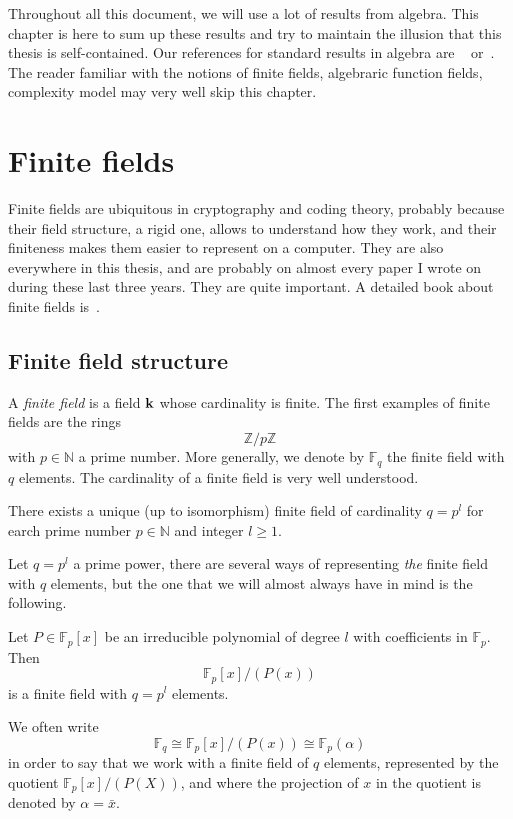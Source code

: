 Throughout all this document, we will use a lot of results from algebra. This
chapter is here to sum up these results and try to maintain the illusion that
this thesis is self-contained. Our references for standard results in algebra are
~\cite{Lang04} or~\cite{Perrin96}.
The reader familiar with the notions of finite
fields, algebraric function fields, complexity model may very well skip this
chapter.
\minitoc
 

%
%

\section{Finite fields}

Finite fields are ubiquitous in cryptography and coding theory, probably because
their field structure, a rigid one, allows to understand how they work, and
their finiteness makes them easier to represent on a computer. They are also
everywhere in this thesis, and are probably on almost every paper I
wrote on during these last three years. They are quite important. A detailed
book about finite fields is~\cite{LN97}.

\subsection{Finite field structure}

A \emph{finite field} is a field $\mathbf{k}$ whose cardinality is finite. The first
examples of finite fields are the rings 
\[
  \mathbb{Z}/p\mathbb{Z}
\]
with $p\in\mathbb{N}$ a prime number. More generally, we denote by
$\mathbb{F}_{q}$ the finite field with $q$ elements. The cardinality of a finite
field is very well understood.
\begin{prop}
 There exists a unique (up to isomorphism) finite field of cardinality $q = p^l$
 for earch prime number $p\in\mathbb{N}$ and integer $l\geq1$.
\end{prop}
Let $q=p^l$ a prime power, there are several ways of representing
\emph{the} finite field with $q$ elements, but the one that we will almost
always have in mind is the following.

\begin{prop}
Let $P\in\mathbb{F}_p[x]$ be an
irreducible polynomial of degree $l$ with coefficients in $\mathbb{F}_p$. Then
\[
  \mathbb{F}_p[x]/(P(x))
\]
is a finite field with $q = p^l$ elements.
\end{prop}
We often write
\[
  \mathbb{F}_q \cong \mathbb{F}_{p}[x]/(P(x))\cong \mathbb{F}_p(\alpha)
\]
in order to say that we work with a finite field of $q$ elements, represented by
the quotient $\mathbb{F}_{p}[x]/(P(X))$, and where the projection of $x$ in the
quotient is denoted by $\alpha=\bar x$.


